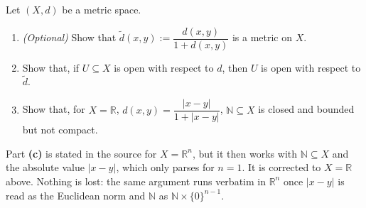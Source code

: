 \begin{exercise}
\label{ex:heine_borel_fails}
Let $(X,d)$ be a metric space.
\begin{enumerate}[label=\textbf{(\alph*)}]
  \item \textit{(Optional)} Show that $\tilde d(x,y) := \dfrac{d(x,y)}{1 + d(x,y)}$ is a metric on
    $X$.
  \item Show that, if $U \subseteq X$ is open with respect to $d$, then $U$ is open with respect
    to $\tilde d$.
  \item Show that, for $X = \mathbb{R}$, $d(x,y) = \dfrac{|x-y|}{1+|x-y|}$,
    $\mathbb{N} \subseteq X$ is closed and bounded but not compact.
\end{enumerate}
\end{exercise}

\begin{ainote}
Part \textbf{(c)} is stated in the source for $X = \mathbb{R}^n$, but it then works with
$\mathbb{N} \subseteq X$ and the absolute value $|x-y|$, which only parses for $n = 1$. It is
corrected to $X = \mathbb{R}$ above. Nothing is lost: the same argument runs verbatim in
$\mathbb{R}^n$ once $|x-y|$ is read as the Euclidean norm and $\mathbb{N}$ as
$\mathbb{N} \times \{0\}^{n-1}$.
\end{ainote}

